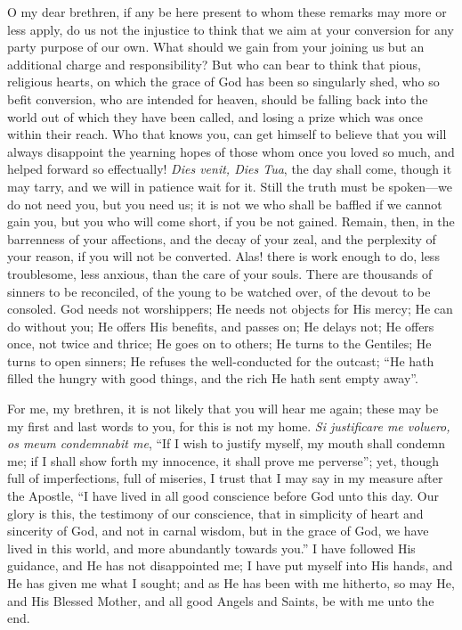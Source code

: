 O my dear brethren, if any be here present to whom these remarks
may more or less apply, do us not the injustice to think that we aim
at your conversion for any party purpose of our own. What should we
gain from your joining us but an additional charge and responsibility?
But who can bear to think that pious, religious hearts, on which the
grace of God has been so singularly shed, who so befit conversion, who
are intended for heaven, should be falling back into the world out of
which they have been called, and losing a prize which was once within
their reach. Who that knows you, can get himself to believe that you
will always disappoint the yearning hopes of those whom once you loved
so much, and helped forward so effectually! \emph{Dies venit, Dies Tua},
the day shall come, though it may tarry, and we will in patience wait
for it. Still the truth must be spoken—we do not need you, but you
need us; it is not we who shall be baffled if we cannot gain you, but
you who will come short, if you be not gained. Remain, then, in the
barrenness of your affections, and the decay of your zeal, and the
perplexity of your reason, if you will not be converted. Alas! there
is work enough to do, less troublesome, less anxious, than the care of
your souls. There are thousands of sinners to be reconciled, of the
young to be watched over, of the devout to be consoled. God needs not
worshippers; He needs not objects for His mercy; He can do without
you; He offers His benefits, and passes on; He delays not; He offers
once, not twice and thrice; He goes on to others; He turns to the
Gentiles; He turns to open sinners; He refuses the well-conducted for
the outcast; ``He hath filled the hungry with good things, and the
rich He hath sent empty away''.

For me, my brethren, it is not likely that you will hear me again;
these may be my first and last words to you, for this is not my home. \emph{Si
justificare me voluero, os meum condemnabit me}, ``If I wish to
justify myself, my mouth shall condemn me; if I shall show forth my
innocence, it shall prove me perverse''; yet, though full of
imperfections, full of miseries, I trust that I may say in my measure
after the Apostle, ``I have lived in all good conscience before
God unto this day. Our glory is this, the testimony of our conscience,
that in simplicity of heart and sincerity of God, and not in carnal
wisdom, but in the grace of God, we have lived in this world, and more
abundantly towards you.'' I have followed His guidance, and He has
not disappointed me; I have put myself into His hands, and He has
given me what I sought; and as He has been with me hitherto, so may
He, and His Blessed Mother, and all good Angels and Saints, be with me
unto the end.

